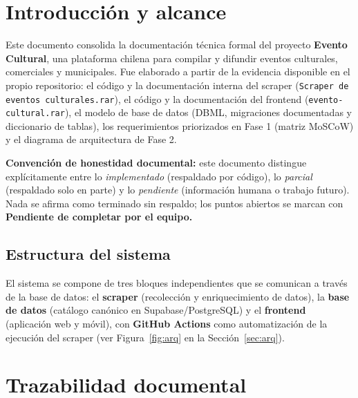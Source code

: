 \documentclass[11pt,a4paper]{article}
\newcommand{\pendiente}{\textcolor{rojo}{\textbf{Pendiente de completar por el equipo.}}}
\begin{document}
\tableofcontents
\newpage

\section{Introducción y alcance}
\label{sec:intro}

Este documento consolida la documentación técnica formal del proyecto \textbf{Evento
Cultural}, una plataforma chilena para compilar y difundir eventos culturales, comerciales
y municipales. Fue elaborado a partir de la evidencia disponible en el propio repositorio:
el código y la documentación interna del scraper (\texttt{Scraper de eventos culturales.rar}),
el código y la documentación del frontend (\texttt{evento-cultural.rar}), el modelo de base
de datos (DBML, migraciones documentadas y diccionario de tablas), los requerimientos
priorizados en Fase 1 (matriz MoSCoW) y el diagrama de arquitectura de Fase 2.

\textbf{Convención de honestidad documental:} este documento distingue explícitamente entre
lo \emph{implementado} (respaldado por código), lo \emph{parcial} (respaldado solo en parte)
y lo \emph{pendiente} (información humana o trabajo futuro). Nada se afirma como terminado
sin respaldo; los puntos abiertos se marcan con \pendiente

\subsection{Estructura del sistema}

El sistema se compone de tres bloques independientes que se comunican a través de la base
de datos: el \textbf{scraper} (recolección y enriquecimiento de datos), la \textbf{base de
datos} (catálogo canónico en Supabase/PostgreSQL) y el \textbf{frontend} (aplicación web y
móvil), con \textbf{GitHub Actions} como automatización de la ejecución del scraper
(ver Figura~\ref{fig:arq} en la Sección~\ref{sec:arq}).





\section{Trazabilidad documental}
\label{sec:traza}
\end{document}

